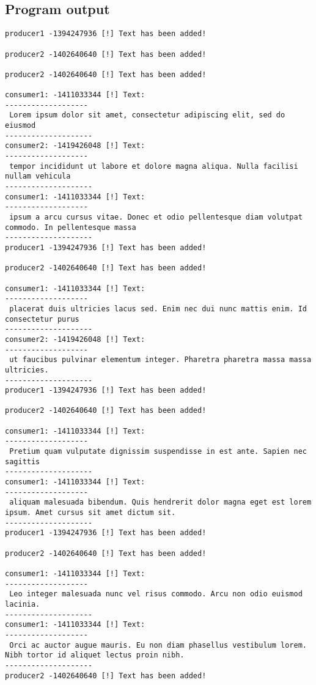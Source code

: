 \documentclass{article}
\begin{document}
\subsection{Program output}
\normalsize
\begin{verbatim}
producer1 -1394247936 [!] Text has been added! 

producer2 -1402640640 [!] Text has been added! 

producer2 -1402640640 [!] Text has been added! 

consumer1: -1411033344 [!] Text: 
-------------------
 Lorem ipsum dolor sit amet, consectetur adipiscing elit, sed do eiusmod 
--------------------
consumer2: -1419426048 [!] Text: 
-------------------
 tempor incididunt ut labore et dolore magna aliqua. Nulla facilisi nullam vehicula 
--------------------
consumer1: -1411033344 [!] Text: 
-------------------
 ipsum a arcu cursus vitae. Donec et odio pellentesque diam volutpat commodo. In pellentesque massa
--------------------
producer1 -1394247936 [!] Text has been added! 

producer2 -1402640640 [!] Text has been added! 

consumer1: -1411033344 [!] Text: 
-------------------
 placerat duis ultricies lacus sed. Enim nec dui nunc mattis enim. Id consectetur purus
--------------------
consumer2: -1419426048 [!] Text: 
-------------------
 ut faucibus pulvinar elementum integer. Pharetra pharetra massa massa ultricies.
--------------------
producer1 -1394247936 [!] Text has been added! 

producer2 -1402640640 [!] Text has been added! 

consumer1: -1411033344 [!] Text: 
-------------------
 Pretium quam vulputate dignissim suspendisse in est ante. Sapien nec sagittis
--------------------
consumer1: -1411033344 [!] Text: 
-------------------
 aliquam malesuada bibendum. Quis hendrerit dolor magna eget est lorem ipsum. Amet cursus sit amet dictum sit.
--------------------
producer1 -1394247936 [!] Text has been added! 

producer2 -1402640640 [!] Text has been added! 

consumer1: -1411033344 [!] Text: 
-------------------
 Leo integer malesuada nunc vel risus commodo. Arcu non odio euismod lacinia. 
--------------------
consumer1: -1411033344 [!] Text: 
-------------------
 Orci ac auctor augue mauris. Eu non diam phasellus vestibulum lorem. Nibh tortor id aliquet lectus proin nibh.
--------------------
producer2 -1402640640 [!] Text has been added! 


\end{verbatim}
\end{document}
